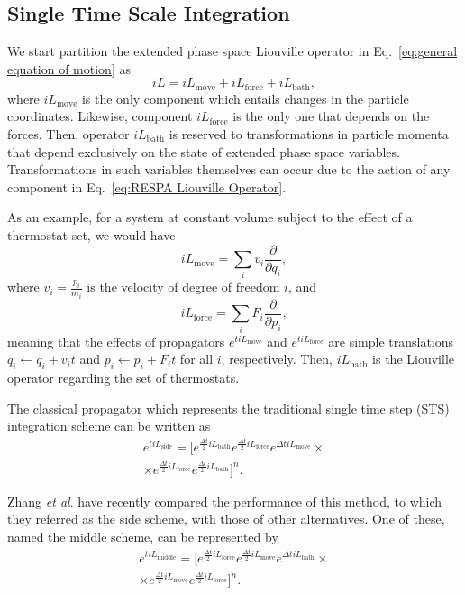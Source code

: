 \documentclass[
    journal=jctcce,
    layout=twocolumn
]{achemso}
\newcommand{\diff}[2]{\frac{\partial #2}{\partial #1}} %
\newcommand{\dof}{i}   %
\newcommand{\Liu}{i\!L}
\begin{document}
\subsection{Single Time Scale Integration}

We start partition the extended phase space Liouville operator in Eq.~\eqref{eq:general equation of motion} as
\begin{equation}
\label{eq:STS Liouville Partition}
\Liu = \Liu_\mathrm{move} + \Liu_\mathrm{force} + \Liu_\mathrm{bath},
\end{equation}
where $\Liu_\mathrm{move}$ is the only component which entails changes in the particle coordinates.
Likewise, component $\Liu_\mathrm{force}$ is the only one that depends on the forces.
Then, operator $\Liu_\mathrm{bath}$ is reserved to transformations in particle momenta that depend exclusively on the state of extended phase space variables.
Transformations in such variables themselves can occur due to the action of any component in Eq.~\eqref{eq:RESPA Liouville Operator}.

As an example, for a system at constant volume subject to the effect of a thermostat set, we would have
\begin{equation}
\Liu_\mathrm{move} = \sum_\dof v_\dof \diff{q_\dof}{},
\end{equation}
where $v_\dof = \frac{p_\dof}{m_\dof}$ is the velocity of degree of freedom $\dof$, and
\begin{equation}
\Liu_\mathrm{force} = \sum_\dof F_\dof \diff{p_\dof}{},
\end{equation}
meaning that the effects of propagators $e^{t \Liu_\mathrm{move}}$ and $e^{t \Liu_\mathrm{force}}$ are simple translations $q_\dof \leftarrow q_\dof + v_\dof t$ and $p_\dof \leftarrow p_\dof + F_\dof t$ for all $\dof$, respectively.
Then, $\Liu_\mathrm{bath}$ is the Liouville operator regarding the set of thermostats.

The classical propagator which represents the traditional single time step (STS) integration scheme can be written as
\begin{multline}
\label{eq:STS side scheme propagator}
e^{t \Liu_\mathrm{side}} = \Big[e^{\frac{\Delta t}{2} \Liu_\mathrm{bath}}
e^{\frac{\Delta t}{2} \Liu_\mathrm{force}}
e^{\Delta t \Liu_\mathrm{move}} \times \\
\times e^{\frac{\Delta t}{2} \Liu_\mathrm{force}}
e^{\frac{\Delta t}{2} \Liu_\mathrm{bath}}
\Big]^{n}.
\end{multline}

Zhang \textit{et al}. \cite{Zhang_2017} have recently compared the performance of this method, to which they referred as the side scheme, with those of other alternatives.
One of these, named the middle scheme, can be represented by
\begin{multline}
\label{eq:STS middle scheme propagator}
e^{t \Liu_\mathrm{middle}} = \Big[e^{\frac{\Delta t}{2} \Liu_\mathrm{force}}
e^{\frac{\Delta t}{2} \Liu_\mathrm{move}}
e^{\Delta t \Liu_\mathrm{bath}} \times \\
\times e^{\frac{\Delta t}{2} \Liu_\mathrm{move}}
e^{\frac{\Delta t}{2} \Liu_\mathrm{force}}
\Big]^{n}.
\end{multline}
\end{document}
